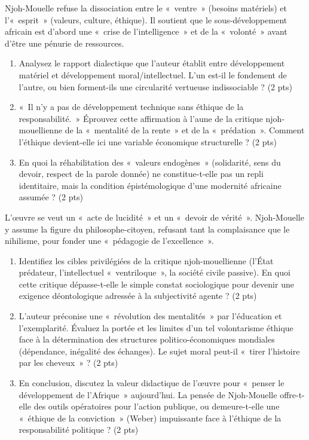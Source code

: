 \documentclass[11pt]{article}
\begin{document}
\begin{exercice}
Njoh-Mouelle refuse la dissociation entre le « ventre » (besoins matériels) et l'« esprit » (valeurs, culture, éthique). Il soutient que le sous-développement africain est d'abord une « crise de l'intelligence » et de la « volonté » avant d'être une pénurie de ressources.
\begin{enumerate}
    \item Analysez le rapport dialectique que l'auteur établit entre développement matériel et développement moral/intellectuel. L'un est-il le fondement de l'autre, ou bien forment-ils une circularité vertueuse indissociable ? (2 pts)
    \item « Il n'y a pas de développement technique sans éthique de la responsabilité. » Éprouvez cette affirmation à l'aune de la critique njoh-mouellienne de la « mentalité de la rente » et de la « prédation ». Comment l'éthique devient-elle ici une variable économique structurelle ? (2 pts)
    \item En quoi la réhabilitation des « valeurs endogènes » (solidarité, sens du devoir, respect de la parole donnée) ne constitue-t-elle pas un repli identitaire, mais la condition épistémologique d'une modernité africaine assumée ? (2 pts)
\end{enumerate}
\end{exercice}

\begin{exercice}
L'œuvre se veut un « acte de lucidité » et un « devoir de vérité ». Njoh-Mouelle y assume la figure du philosophe-citoyen, refusant tant la complaisance que le nihilisme, pour fonder une « pédagogie de l'excellence ».
\begin{enumerate}
    \item Identifiez les cibles privilégiées de la critique njoh-mouellienne (l'État prédateur, l'intellectuel « ventriloque », la société civile passive). En quoi cette critique dépasse-t-elle le simple constat sociologique pour devenir une exigence déontologique adressée à la subjectivité agente ? (2 pts)
    \item L'auteur préconise une « révolution des mentalités » par l'éducation et l'exemplarité. Évaluez la portée et les limites d'un tel volontarisme éthique face à la détermination des structures politico-économiques mondiales (dépendance, inégalité des échanges). Le sujet moral peut-il « tirer l'histoire par les cheveux » ? (2 pts)
    \item En conclusion, discutez la valeur didactique de l'œuvre pour « penser le développement de l'Afrique » aujourd'hui. La pensée de Njoh-Mouelle offre-t-elle des outils opératoires pour l'action publique, ou demeure-t-elle une « éthique de la conviction » (Weber) impuissante face à l'éthique de la responsabilité politique ? (2 pts)
\end{enumerate}
\end{exercice}
\end{document}
